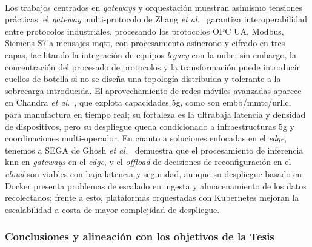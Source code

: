 \\
Los trabajos centrados en \textit{gateways} y orquestación muestran asimismo tensiones prácticas: el \textit{gateway} multi-protocolo de Zhang \textit{et al.}~\cite{zhang2020architecture} garantiza interoperabilidad entre protocolos industriales, procesando los protocolos OPC UA, Modbus, Siemens S7 a mensajes \gls{mqtt}, con procesamiento asíncrono y cifrado en tres capas, facilitando la integración de equipos \textit{legacy} con la nube; sin embargo, la concentración del procesado de protocolos y la transformación puede introducir cuellos de botella si no se diseña una topología distribuida y tolerante a la sobrecarga introducida. El aprovechamiento de redes móviles avanzadas aparece en Chandra \textit{et al.}~\cite{chandra20215g}, que explota capacidades \gls{5g}, como  son \gls{embb}/\gls{mmtc}/\gls{urllc}, para manufactura en tiempo real; su fortaleza es la ultrabaja latencia y densidad de dispositivos, pero su despliegue queda condicionado a infraestructuras \gls{5g} y coordinaciones multi-operador. En cuanto a soluciones enfocadas en el \textit{edge}, tenemos a SEGA de Ghosh \textit{et al.}~\cite{ghosh2021sega} demuestra que el procesamiento de inferencia \gls{knn} en \textit{gateways} en el \textit{edge}, y el \textit{offload} de decisiones de reconfiguración en el \textit{cloud} son viables con baja latencia y seguridad, aunque su despliegue basado en Docker presenta problemas de escalado en ingesta y almacenamiento de los datos recolectados; frente a esto, plataformas orquestadas con Kubernetes mejoran la escalabilidad a costa de mayor complejidad de despliegue.

\subsubsection{Conclusiones y alineación con los objetivos de la Tesis}
\label{subsubsec:conclu_iiot}

